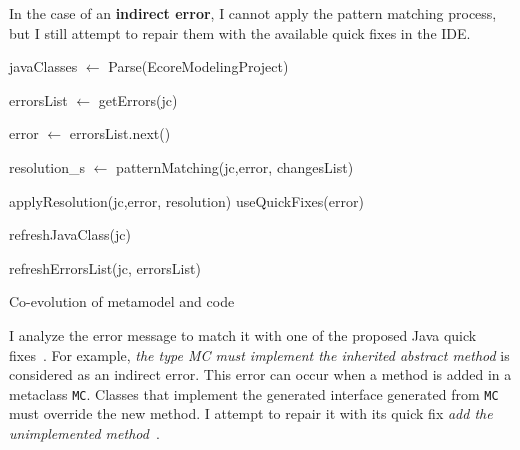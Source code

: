 In the case of an \textbf{indirect error}, I cannot apply the pattern matching process, but I still attempt to repair them with the available quick fixes in the IDE. 
\begin{algorithm}[H]
	\small
	\SetAlgoLined
	javaClasses $\leftarrow$ Parse(EcoreModelingProject)
	
	{
		errorsList $\leftarrow $ getErrors(jc)
		
		{
			error  $\leftarrow$ errorsList.next()
			
			resolution\_s $\leftarrow$ patternMatching(jc,error, changesList)
			
			{
				{
					applyResolution(jc,error, resolution)
				}
			}
			{
				useQuickFixes(error) %
			}
			
			refreshJavaClass(jc) 
			
			refreshErrorsList(jc, errorsList)
		}
		
	}
	\caption{Co-evolution of metamodel and code}
	\label{algo :overallalgo}
\end{algorithm}

%
%
I analyze the error message to match it with one of the proposed Java quick fixes~{\small{}}. For example, \emph{the type MC must implement the inherited abstract method} is considered as an indirect error. 
This error can occur when a method is added in a metaclass \texttt{MC}. Classes that implement the generated interface generated from \texttt{MC} must override the new method.
I attempt to repair it with its quick fix \emph{add the unimplemented method}~{\small{}}.

